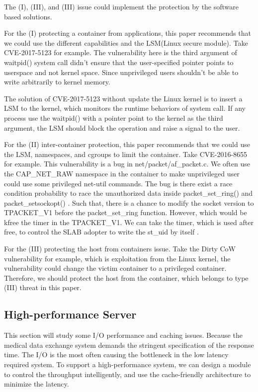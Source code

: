 \documentclass[12pt,a4paper]{article}
\begin{document}
The (\RN{1}), (\RN{3}), and (\RN{3}) issue could implement the protection by the software
based solutions.

For the (\RN{1}) protecting a container from applications, this paper recommends that
we could use the different capabilities and the LSM(Linux secure module). Take
CVE-2017-5123 \cite{CVE-2017-5123} for example. The vulnerability here is the third argument of
waitpid() system call didn't ensure that the user-specified pointer points to userspace
and not kernel space. Since unprivileged users shouldn’t be able to write arbitrarily
to kernel memory.

The solution of CVE-2017-5123 without update the Linux kernel is to insert a
LSM to the kernel, which monitors the runtime behaviors of system call. If any process
use the waitpid() with a pointer point to the kernel as the third argument, the LSM should
block the operation and raise a signal to the user.

For the (\RN{2}) inter-container protection, this paper recommends that we could use the
LSM, namespaces, and cgroups to limit the container. Take CVE-2016-8655 \cite{CVE-2016-8655}
for example. This vulnerability is a bug in net/packet/af\_packet.c. We often use the
CAP\_NET\_RAW namespace in the container to make unprivileged user could use some privileged
net-util commands. The bug is there exist a race condition probability to race the unauthorized
data inside packet\_set\_ring() and packet\_setsockopt() \cite{CVE-2016-8655-lwn}. Such that,
there is a chance to modify the socket version to TPACKET\_V1 before the packet\_set\_ring
function. However, which would be kfree the timer in the TPACKET\_V1. We can take the timer,
which is used after free, to control the SLAB adopter to write the st\_uid by itself
\cite{AF_PACKET}.

For the (\RN{3}) protecting the host from containers issue.
Take the Dirty CoW vulnerability for example, which is exploitation from the Linux kernel,
the vulnerability could change the victim container to a privileged container. Therefore, we should
protect the host from the container, which belongs to type (\RN{3}) threat in this paper.

\subsection{High-performance Server}
\hypertarget{heigh_performance}{}
This section will study some I/O performance and caching issues. Because the medical
data exchange system demands the stringent specification of the response time.
The I/O is the most often causing the bottleneck in the low latency required system.
To support a high-performance system, we can design a module to control the throughput
intelligently, and use the cache-friendly architecture to minimize the latency.
\end{document}

